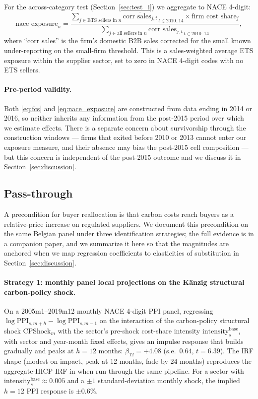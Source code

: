 For the across-category test (Section~\ref{sec:test_i}) we aggregate to NACE 4-digit:
\begin{equation}
    \text{nace exposure}_n = \frac{\sum_{j \in \text{ETS sellers in } n} \overline{\text{corr sales}_{j,t}}_{\,t \in 2010..14} \times \text{firm cost share}_j}{\sum_{j \in \text{all sellers in } n} \overline{\text{corr sales}_{j,t}}_{\,t \in 2010..14}},
    \label{eq:nace_exposure}
\end{equation}
where ``corr sales'' is the firm's domestic B2B sales corrected for the small known under-reporting on the small-firm threshold. This is a sales-weighted average ETS exposure within the supplier sector, set to zero in NACE 4-digit codes with no ETS sellers.

\paragraph{Pre-period validity.}
Both \eqref{eq:fcs} and \eqref{eq:nace_exposure} are constructed from data ending in 2014 or 2016, so neither inherits any information from the post-2015 period over which we estimate effects. There is a separate concern about survivorship through the construction windows --- firms that exited before 2010 or 2013 cannot enter our exposure measure, and their absence may bias the post-2015 cell composition --- but this concern is independent of the post-2015 outcome and we discuss it in Section~\ref{sec:discussion}.

\subsection{Pass-through}\label{sec:passthrough}

A precondition for buyer reallocation is that carbon costs reach buyers as a relative-price increase on regulated suppliers. We document this precondition on the same Belgian panel under three identification strategies; the full evidence is in a companion paper, and we summarize it here so that the magnitudes are anchored when we map regression coefficients to elasticities of substitution in Section~\ref{sec:discussion}.

\paragraph{Strategy 1: monthly panel local projections on the Känzig structural carbon-policy shock.} On a 2005m1--2019m12 monthly NACE 4-digit PPI panel, regressing $\log \text{PPI}_{s,m+h} - \log \text{PPI}_{s,m-1}$ on the interaction of the \citet{kanzig2023unequal} carbon-policy structural shock $\text{CPShock}_m$ with the sector's pre-shock cost-share intensity $\text{intensity}_s^{\text{base}}$, with sector and year-month fixed effects, gives an impulse response that builds gradually and peaks at $h = 12$ months: $\beta_{12} = +4.08$ (s.e.\ $0.64$, $t = 6.39$). The IRF shape (modest on impact, peak at 12 months, fade by 24 months) reproduces the aggregate-HICP IRF in \citet{kanzig2023unequal} when run through the same pipeline. For a sector with $\text{intensity}_s^{\text{base}} \approx 0.005$ and a $\pm 1$ standard-deviation monthly shock, the implied $h = 12$ PPI response is $\pm 0.6$\%.

